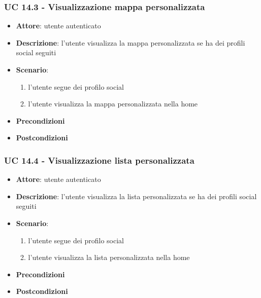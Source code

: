 \subsubsection{UC 14.3 - Visualizzazione mappa personalizzata}
\begin{itemize}
    \item \textbf{Attore}: utente autenticato
    \item \textbf{Descrizione}: l’utente visualizza la mappa personalizzata se ha dei profili social seguiti
    \item \textbf{Scenario}:
        \begin{enumerate}
            \item l’utente segue dei profilo social
            \item l’utente visualizza la mappa personalizzata nella home
        \end{enumerate}
    \item \textbf{Precondizioni}
    \item \textbf{Postcondizioni}
\end{itemize}

\subsubsection{UC 14.4 - Visualizzazione lista personalizzata}
\begin{itemize}
    \item \textbf{Attore}: utente autenticato
    \item \textbf{Descrizione}: l’utente visualizza la lista personalizzata se ha dei profili social seguiti
    \item \textbf{Scenario}: 
        \begin{enumerate}
            \item l’utente segue dei profilo social
            \item l’utente visualizza la lista personalizzata nella home
        \end{enumerate}
    \item \textbf{Precondizioni}
    \item \textbf{Postcondizioni}
\end{itemize}

